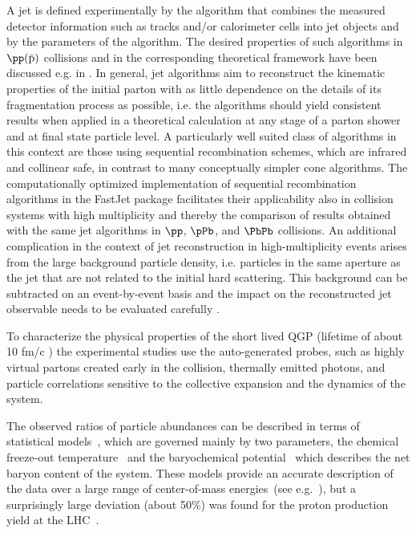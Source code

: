 A jet is defined experimentally by the algorithm that combines the measured detector information such as tracks and/or calorimeter cells into jet objects and by the parameters of the algorithm.
%
The desired properties of such algorithms in $\pp(\bar{\mathrm{p}})$ collisions and in the corresponding theoretical framework have been discussed e.g. in \cite{Huth:1990mi}.
%
In general, jet algorithms aim to reconstruct the kinematic properties of the initial parton with as little dependence on the details of its fragmentation process as possible, i.e. the algorithms should yield consistent results when applied in a theoretical calculation at any stage of a parton shower and at final state particle level.
%
A particularly well suited class of algorithms in this context are those using sequential recombination schemes, which are infrared and collinear safe, in contrast to many conceptually simpler cone algorithms.
%
The computationally optimized implementation of
sequential recombination algorithms in the FastJet package
\cite{Cacciari:2005hq} facilitates their applicability also in collision systems with high multiplicity and thereby the comparison of results obtained with the same jet
algorithms in $\pp$, $\pPb$, and $\PbPb$ collisions.
%
An additional complication in the context of jet reconstruction in high-multiplicity events arises from the large background particle density, i.e. particles in the same aperture as the jet that are not related to the initial hard scattering.
%
This background can be subtracted on an event-by-event basis
and the impact on the reconstructed jet observable needs to be evaluated carefully \cite{Cacciari:2011tm,Abelev:2013kqa,Abelev:2012ej}.

%

To characterize the physical properties of the short lived QGP (lifetime of about
10 fm/c \cite{Aamodt:2010jj}) the experimental studies use the auto-generated probes, such as
highly virtual partons created early in the collision, thermally
emitted photons, and particle correlations sensitive to the collective
expansion and the dynamics of the system.


The observed ratios of particle
abundances can be described in terms of statistical
models~\cite{Andronic:2008gu,Cleymans:2006xj}, which are governed
mainly by two parameters, the chemical freeze-out temperature \Tch\
and the baryochemical potential \muB\, which describes the net baryon
content of the system.
These models provide an accurate description of the data over a large
range of center-of-mass energies~(see
e.g.~\cite{BraunMunzinger:2003zz}), but a surprisingly large deviation
(about 50\%) was found for the proton production yield at the LHC~\cite{prl-spectra,
  Abelev:2013vea}.

